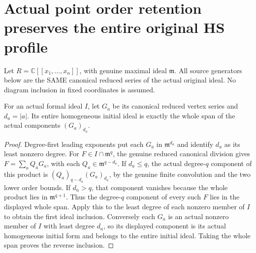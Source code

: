\section{Actual point order retention preserves the entire original HS profile}

Let $R=\mathbb C[[x_1,\ldots,x_n]]$, with genuine maximal ideal
$\mathfrak m$. All source generators below are the SAME canonical
reduced series of the actual original ideal. No diagram inclusion in
fixed coordinates is assumed.

\begin{theorem}
\label{hir:actual-reduced-canonical-homogeneous-initial-span}
\leanok
For an actual formal ideal $I$, let $G_a$ be its canonical reduced
vertex series and $d_a=|a|$. Its entire homogeneous initial ideal is
exactly the whole span of the actual components $(G_a)_{d_a}$.
\end{theorem}
\begin{proof}
Degree-first leading exponents put each $G_a$ in
$\mathfrak m^{d_a}$ and identify $d_a$ as its least nonzero degree.
For $F\in I\cap\mathfrak m^q$, the genuine reduced canonical division
gives $F=\sum_aQ_aG_a$, with each
$Q_a\in\mathfrak m^{q-d_a}$. If $d_a\le q$, the actual degree-$q$
component of this product is $(Q_a)_{q-d_a}(G_a)_{d_a}$, by the genuine
finite convolution and the two lower order bounds. If $d_a>q$, that
component vanishes because the whole product lies in
$\mathfrak m^{q+1}$. Thus the degree-$q$ component of every such $F$
lies in the displayed whole span. Apply this to the least degree of
each nonzero member of $I$ to obtain the first ideal inclusion.
Conversely each $G_a$ is an actual nonzero member of $I$ with least
degree $d_a$, so its displayed component is its actual homogeneous
initial form and belongs to the entire initial ideal. Taking the
whole span proves the reverse inclusion.
\end{proof}

